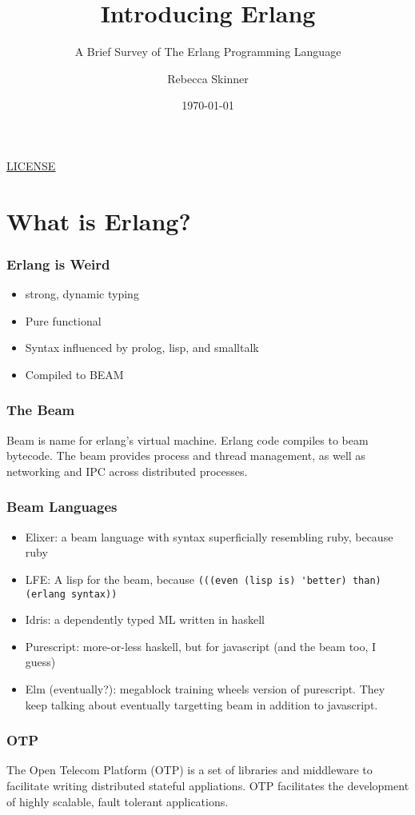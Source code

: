 \documentclass{beamer}
\title{Introducing Erlang}
\subtitle{A Brief Survey of The Erlang Programming Language}
\author{Rebecca Skinner}
\institute{Rackspace Hosting}
\date{\today}
\newcommand{\chref}[3] {
  {\color{#1} \href{#2}{\underline{#3}}}
}
\begin{document}
\begin{frame}
  \titlepage{}
  \begin{center}
    \small{\chref{blue}{http://creativecommons.org/licenses/by-sa/4.0/}{LICENSE}}
  \end{center}
\end{frame}

\section{What is Erlang?}

\begin{frame}
  \frametitle{Erlang is Weird}
  \begin{itemize}
  \item strong, dynamic typing
  \item Pure functional
  \item Syntax influenced by prolog, lisp, and smalltalk
  \item Compiled to BEAM
  \end{itemize}
\end{frame}

\begin{frame}
  \frametitle{The Beam}
  Beam is name for erlang's virtual machine.  Erlang code compiles to
  beam bytecode.  The beam provides process and thread management, as
  well as networking and IPC across distributed processes.
\end{frame}

\begin{frame}[fragile]
  \frametitle{Beam Languages}
  \begin{itemize}
  \item Elixer: a beam language with syntax superficially resembling ruby, because ruby
  \item LFE: A lisp for the beam, because {\small \verb!(((even (lisp is) 'better) than) (erlang syntax))!}
  \item Idris: a dependently typed ML written in haskell
  \item Purescript: more-or-less haskell, but for javascript (and the beam too, I guess)
  \item Elm (eventually?): megablock training wheels version of purescript.  They keep talking about eventually targetting beam in addition to javascript.
  \end{itemize}
\end{frame}

\begin{frame}
  \frametitle{OTP}
  The Open Telecom Platform (OTP) is a set of libraries and middleware
  to facilitate writing distributed stateful appliations.  OTP
  facilitates the development of highly scalable, fault tolerant
  applications.
\end{frame}
\end{document}
